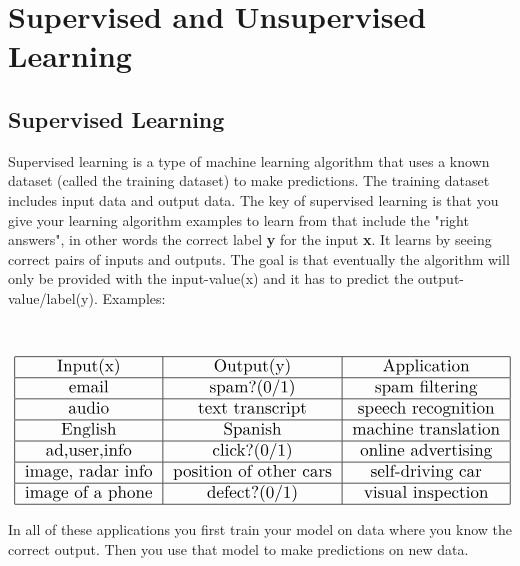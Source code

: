 \section{Supervised and Unsupervised Learning}

\subsection{Supervised Learning}
Supervised learning is a type of machine learning algorithm that uses a known dataset (called the training dataset) to make predictions. The training dataset includes input data and output data. The key of supervised learning is that you give your learning algorithm examples to learn from that include the "right answers", in other words the correct label \textbf{y} for the input \textbf{x}.
It learns by seeing correct pairs of inputs and outputs.  The goal is that eventually the algorithm will only be provided with the input-value(x) and it has to predict the output-value/label(y). 
Examples: \\ \\ \\

\begin{align*}
    \scalebox{1.3}{
\begin{tabular}{|c|c|c|}
    \hline
    Input(x) & Output(y) & Application \\
    \hline
    email & spam?(0/1) & spam filtering \\
    \hline
    audio & text transcript & speech recognition \\
    \hline
    English & Spanish & machine translation \\
    \hline
    ad,user,info & click?(0/1) & online advertising \\
    \hline
    image, radar info & position of other cars & self-driving car \\
    \hline
    image of a phone & defect?(0/1) & visual inspection \\
    \hline
\end{tabular}}
\end{align*}

In all of these applications you first train your model on data where you know the correct output. Then you use that model to make predictions on new data. \\